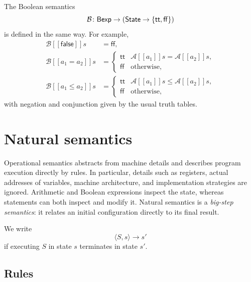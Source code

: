 \documentclass[a4paper]{article}
\newcommand{\State}{\mathsf{State}}
\newcommand{\Bexp}{\mathsf{Bexp}}
\newcommand{\ttt}{\mathsf{tt}}
\newcommand{\fff}{\mathsf{ff}}
\newcommand{\sem}[1]{[\![#1]\!]}
\begin{document}
The Boolean semantics
\[
    \mathcal B\colon\Bexp\fromto(\State\fromto\{\ttt,\fff\})
\]
is defined in the same way. For example,
\begin{align*}
    \mathcal B\sem{\mathsf{false}}s &= \fff,\\
    \mathcal B\sem{a_1=a_2}s &=
    \begin{cases}
        \ttt & \mathcal A\sem{a_1}s=\mathcal A\sem{a_2}s,\\
        \fff & \text{otherwise},
    \end{cases}\\
    \mathcal B\sem{a_1\leq a_2}s &=
    \begin{cases}
        \ttt & \mathcal A\sem{a_1}s\leq\mathcal A\sem{a_2}s,\\
        \fff & \text{otherwise},
    \end{cases}
\end{align*}
with negation and conjunction given by the usual truth tables.

\section{Natural semantics}

Operational semantics abstracts from machine details and describes program execution directly by rules.
In particular, details such as registers, actual addresses of variables, machine architecture, and implementation strategies are ignored.
Arithmetic and Boolean expressions inspect the state, whereas statements can both inspect and modify it.
Natural semantics is a \emph{big-step semantics}: it relates an initial configuration directly to its final result.

We write
\[
    \langle S,s\rangle\to s'
\]
if executing \(S\) in state \(s\) terminates in state \(s'\).

\subsection{Rules}
\end{document}
